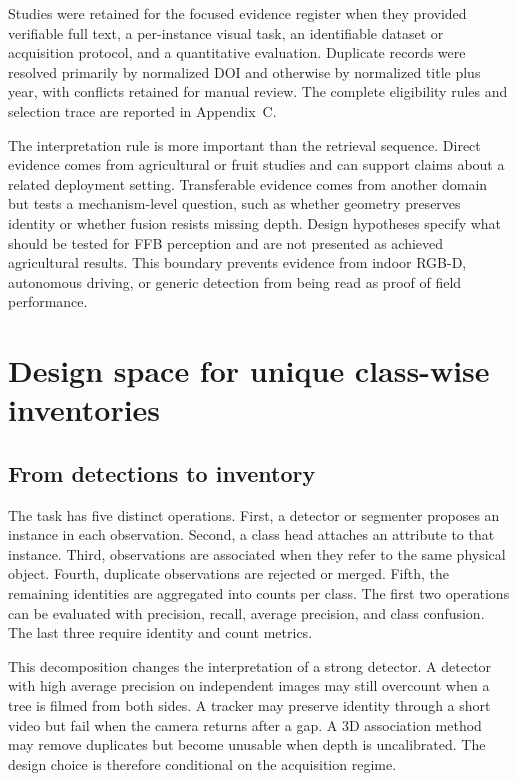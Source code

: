 Studies were retained for the focused evidence register when they provided verifiable full text, a per-instance visual task, an identifiable dataset or acquisition protocol, and a quantitative evaluation. Duplicate records were resolved primarily by normalized DOI and otherwise by normalized title plus year, with conflicts retained for manual review. The complete eligibility rules and selection trace are reported in Appendix~C.

The interpretation rule is more important than the retrieval sequence. Direct evidence comes from agricultural or fruit studies and can support claims about a related deployment setting. Transferable evidence comes from another domain but tests a mechanism-level question, such as whether geometry preserves identity or whether fusion resists missing depth. Design hypotheses specify what should be tested for FFB perception and are not presented as achieved agricultural results. This boundary prevents evidence from indoor RGB-D, autonomous driving, or generic detection from being read as proof of field performance.

\section{Design space for unique class-wise inventories}
\label{sec:designspace}

\subsection{From detections to inventory}

The task has five distinct operations. First, a detector or segmenter proposes an instance in each observation. Second, a class head attaches an attribute to that instance. Third, observations are associated when they refer to the same physical object. Fourth, duplicate observations are rejected or merged. Fifth, the remaining identities are aggregated into counts per class. The first two operations can be evaluated with precision, recall, average precision, and class confusion. The last three require identity and count metrics.

This decomposition changes the interpretation of a strong detector. A detector with high average precision on independent images may still overcount when a tree is filmed from both sides. A tracker may preserve identity through a short video but fail when the camera returns after a gap. A 3D association method may remove duplicates but become unusable when depth is uncalibrated. The design choice is therefore conditional on the acquisition regime.

